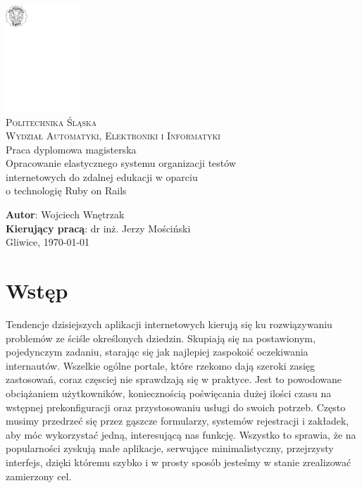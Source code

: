 \documentclass[12pt,twoside]{report}
\begin{document}
\pagestyle{fancy}
\lhead{\nouppercase{\rightmark}}
\rhead{\nouppercase{\leftmark}}
\renewcommand{\chaptermark}[1]{\markboth{\chaptername \ \thechapter. \ #1}{}}
\renewcommand{\sectionmark}[1]{\markright{#1}{}}
\fancyhead{}
\fancyfoot{}
\fancyhead[LO]{\rightmark}
\fancyhead[RE]{\leftmark}
\fancyhead[LE]{\thepage}
\fancyhead[RO]{\thepage}

\begin{titlepage}
  \begin{center}
    \includegraphics[width=80pt]{images/godlo.pdf}\\[30pt]
    \Large\textsc{Politechnika Śląska}\\[0.5em]
    \textsc{Wydział Automatyki, Elektroniki i Informatyki}\\[100pt]
    \LARGE Praca dyplomowa magisterska\\[50pt]
    Opracowanie elastycznego systemu organizacji testów\\[0.5em]
    internetowych do zdalnej edukacji w oparciu\\[0.5em]
    o technologię Ruby on Rails\\[80pt]
  \end{center}
  \Large\textbf{Autor}: Wojciech Wnętrzak\\
  \Large\textbf{Kierujący pracą}: dr inż. Jerzy Mościński\\
  \vfill
  \normalsize\centering Gliwice, \today
\end{titlepage}

\tableofcontents

\cleardoublepage
\chapter{Wstęp}
Tendencje dzisiejszych aplikacji internetowych kierują się ku rozwiązywaniu problemów ze
ściśle określonych dziedzin. Skupiają się na postawionym, pojedynczym zadaniu, starając
się jak najlepiej zaspokoić oczekiwania internautów. Wszelkie ogólne portale, które
rzekomo dają szeroki zasięg zastosowań, coraz częsciej nie sprawdzają się w
praktyce. Jest to powodowane obciążaniem użytkowników, koniecznością poświęcania dużej
ilości czasu na wstępnej prekonfiguracji oraz przystosowaniu usługi do swoich potrzeb.
Często musimy przedrzeć się przez gąszcze formularzy, systemów rejestracji i zakładek, aby
móc wykorzystać jedną, interesującą nas funkcję. Wszystko to sprawia, że na popularności
zyskują małe aplikacje, serwujące minimalistyczny, przejrzysty interfejs, dzięki któremu
szybko i w prosty sposób jesteśmy w stanie zrealizować zamierzony cel.
\end{document}
